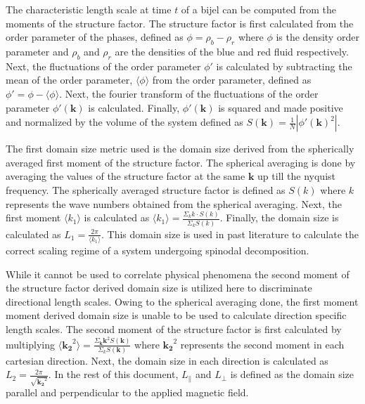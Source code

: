 The characteristic length scale at time $t$ of a bijel can be computed from the moments of the structure factor. The 
structure factor is first calculated from the order parameter of the phases, defined as $\phi = \rho_b - \rho_r$ where 
$\phi$ is the density order parameter and $\rho_b$ and $\rho_r$ are the densities of the blue and red fluid respectively. 
Next, the fluctuations of the order parameter $\phi'$ is calculated by subtracting the mean of the order parameter, 
$\langle \phi \rangle$ from the order parameter, defined as $\phi' = \phi - \langle \phi \rangle$. Next, the fourier 
transform of the fluctuations of the order parameter $\phi'(\mathbf{k})$ is calculated. Finally, $\phi'(\mathbf{k})$ 
is squared and made positive and normalized by the volume of the system defined as 
$S(\mathbf{k}) = \frac{1}{N} |\phi'(\mathbf{k})^2|$.

The first domain size metric used is the domain size derived from the spherically averaged first moment of the structure 
factor. The spherical averaging is done by averaging the values of the structure factor at the same $\mathbf{k}$ up 
till the nyquist frequency. The spherically averaged structure factor is defined as $S(k)$ where $k$ represents the 
wave numbers obtained from the spherical averaging. Next, the first moment $\langle k_1 \rangle$ is calculated as 
$\langle k_1 \rangle = \frac{\Sigma_{k} k\cdot S(k)}{\Sigma_{k} S(k)}$. Finally, the domain size is calculated as 
$L_1 = \frac{2 \pi}{\langle k_1 \rangle}$. \cite{kendon_inertial_2001,kendon_3d_1999} This domain size is used in past literature 
to calculate the correct scaling regime of a system undergoing spinodal decomposition. 

While it cannot be used to correlate physical phenomena the second moment of the structure factor derived domain 
size is utilized here to discriminate directional length scales. Owing to the spherical averaging done, the first 
moment moment derived domain size is unable to be used to calculate direction specific length scales. The second 
moment of the structure factor is first calculated by multiplying 
$\langle \mathbf{k_2}^2 \rangle = \frac{\Sigma_{\mathbf{k}} \mathbf{k}^2 S(\mathbf{k})}{\Sigma_k S(\mathbf{k})}$ 
where $\mathbf{k_2}^2$ represents the second moment in each cartesian direction. Next, the domain size in each 
direction is calculated as $L_2 = \frac{2 \pi}{\sqrt{\mathbf{k_2}^2}}$. \cite{jansen_bijels_2011, gunther_timescales_2014} 
In the rest of this document, $L_{\parallel}$ and $L_{\perp}$ is defined as the domain size parallel and perpendicular to 
the applied magnetic field.

